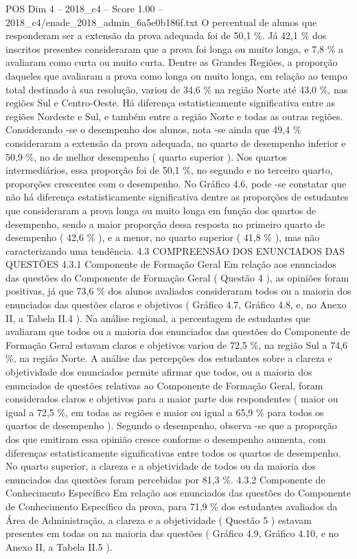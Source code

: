 \begin{textsample}{POS Dim 4 – 2018\_c4 – Score 1.00 – 2018\_c4/enade\_2018\_admin\_6a5e0b186f.txt}
O percentual de alunos que responderam ser a extensão da prova adequada foi de 50,1 \%.
Já 42,1 \% dos inscritos presentes consideraram que a prova foi longa ou muito longa, e 7,8 \% a avaliaram como curta ou muito curta.
Dentre as Grandes Regiões, a proporção daqueles que avaliaram a prova como longa ou muito longa, em relação ao tempo total destinado à sua resolução, variou de 34,6 \% na região Norte até 43,0 \%, nas regiões Sul e Centro-Oeste.
Há diferença estatisticamente significativa entre as regiões Nordeste e Sul, e também entre a região Norte e todas as outras regiões.
Considerando -se o desempenho dos alunos, nota -se ainda que 49,4 \% consideraram a extensão da prova adequada, no quarto de desempenho inferior e 50,9 \%, no de melhor desempenho ( quarto superior ).
Nos quartos intermediários, essa proporção foi de 50,1 \%, no segundo e no terceiro quarto, proporções crescentes com o desempenho.
No Gráfico 4.6, pode -se constatar que não há diferença estatisticamente significativa dentre as proporções de estudantes que consideraram a prova longa ou muito longa em função dos quartos de desempenho, sendo a maior proporção dessa resposta no primeiro quarto de desempenho ( 42,6 \% ), e a menor, no quarto superior ( 41,8 \% ), mas não caracterizando uma tendência. 4.3 COMPREENSÃO DOS ENUNCIADOS DAS QUESTÕES 4.3.1 Componente de Formação Geral Em relação aos enunciados das questões do Componente de Formação Geral ( Questão 4 ), as opiniões foram positivas, já que 73,6 \% dos alunos avaliados consideraram todos ou a maioria dos enunciados das questões claros e objetivos ( Gráfico 4.7, Gráfico 4.8, e, no Anexo II, a Tabela II.4 ).
Na análise regional, a percentagem de estudantes que avaliaram que todos ou a maioria dos enunciados das questões do Componente de Formação Geral estavam claros e objetivos variou de 72,5 \%, na região Sul a 74,6 \%, na região Norte.
A análise das percepções dos estudantes sobre a clareza e objetividade dos enunciados permite afirmar que todos, ou a maioria dos enunciados de questões relativas ao Componente de Formação Geral, foram considerados claros e objetivos para a maior parte dos respondentes ( maior ou igual a 72,5 \%, em todas as regiões e maior ou igual a 65,9 \% para todos os quartos de desempenho ).
Segundo o desempenho, observa -se que a proporção dos que emitiram essa opinião cresce conforme o desempenho aumenta, com diferenças estatisticamente significativas entre todos os quartos de desempenho.
No quarto superior, a clareza e a objetividade de todos ou da maioria dos enunciados das questões foram percebidas por 81,3 \%. 4.3.2 Componente de Conhecimento Específico Em relação aos enunciados das questões do Componente de Conhecimento Específico da prova, para 71,9 \% dos estudantes avaliados da Área de Administração, a clareza e a objetividade ( Questão 5 ) estavam presentes em todas ou na maioria das questões ( Gráfico 4.9, Gráfico 4.10, e no Anexo II, a Tabela II.5 ).

\end{textsample}
